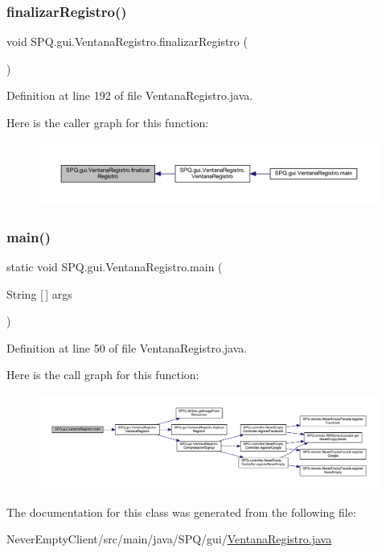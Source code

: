 \subsubsection{\texorpdfstring{finalizar\+Registro()}{finalizarRegistro()}}
{\footnotesize\ttfamily void S\+P\+Q.\+gui.\+Ventana\+Registro.\+finalizar\+Registro (\begin{DoxyParamCaption}{ }\end{DoxyParamCaption})}



Definition at line 192 of file Ventana\+Registro.\+java.

Here is the caller graph for this function\+:\nopagebreak
\begin{figure}[H]
\begin{center}
\leavevmode
\includegraphics[width=350pt]{class_s_p_q_1_1gui_1_1_ventana_registro_ac33d30ad4e6980a453a3a6c3de20f468_icgraph}
\end{center}
\end{figure}
\mbox{\label{class_s_p_q_1_1gui_1_1_ventana_registro_a8d80a5efba104ecaefab065592e23a68}} 
\subsubsection{\texorpdfstring{main()}{main()}}
{\footnotesize\ttfamily static void S\+P\+Q.\+gui.\+Ventana\+Registro.\+main (\begin{DoxyParamCaption}\item[{String \mbox{[}$\,$\mbox{]}}]{args }\end{DoxyParamCaption})\hspace{0.3cm}{\ttfamily [static]}}



Definition at line 50 of file Ventana\+Registro.\+java.

Here is the call graph for this function\+:\nopagebreak
\begin{figure}[H]
\begin{center}
\leavevmode
\includegraphics[width=350pt]{class_s_p_q_1_1gui_1_1_ventana_registro_a8d80a5efba104ecaefab065592e23a68_cgraph}
\end{center}
\end{figure}


The documentation for this class was generated from the following file\+:\begin{DoxyCompactItemize}
\item 
Never\+Empty\+Client/src/main/java/\+S\+P\+Q/gui/\mbox{\hyperlink{_ventana_registro_8java}{Ventana\+Registro.\+java}}\end{DoxyCompactItemize}
